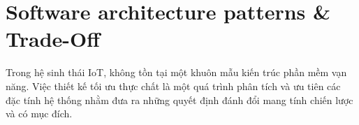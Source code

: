\section{Software architecture patterns \& Trade-Off}
Trong hệ sinh thái IoT, không tồn tại một khuôn mẫu kiến trúc phần mềm vạn năng. Việc thiết kế tối ưu thực chất là một quá trình phân tích và ưu tiên các đặc tính hệ thống nhằm đưa ra những quyết định đánh đổi mang tính chiến lược và có mục đích.














